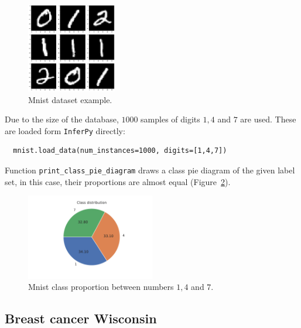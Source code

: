 \begin{figure}[h!]
    \centering
    \includegraphics[width=0.35\textwidth]{tex/images/mnist.png}
    \caption{Mnist dataset example.}\label{fig:mnist_example}
  \end{figure}

Due to the size of the database, \(1000\) samples of digits \(1,4\) and \(7\) are used. These are loaded form \texttt{InferPy} directly:

\begin{verbatim}
  mnist.load_data(num_instances=1000, digits=[1,4,7])
\end{verbatim}

Function \texttt{print\_class\_pie\_diagram} draws a class pie diagram of the given label set, in this case, their proportions are almost equal (Figure~\ref{fig:mnist_proportion}).

\begin{figure}
  \centering
  \includegraphics[width = 0.5\textwidth]{tex/images/mnist_proportion.pdf}
  \caption{Mnist class proportion between numbers \(1, 4\) and \(7\).}\label{fig:mnist_proportion}
\end{figure}

\subsection{Breast cancer Wisconsin}

